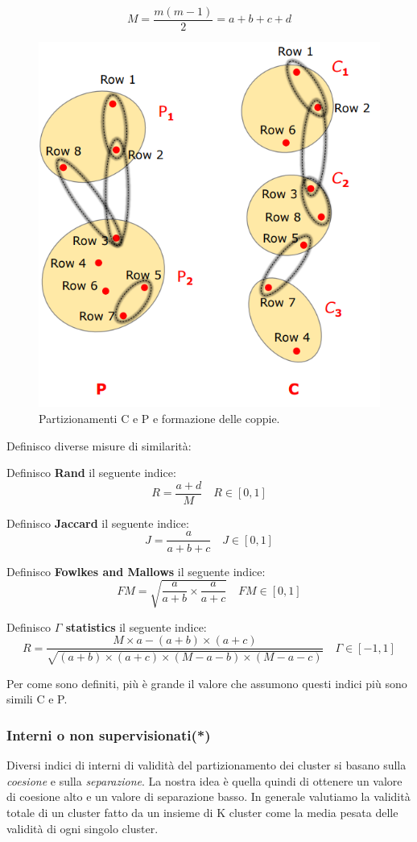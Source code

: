 \[M =  \frac{m(m-1)}{2} =  a+b+c+d\]

\begin{figure}[H]
	\centering
	\includegraphics[height=0.40 \linewidth]{clustering/pict/partizionamenti.png}
	\caption{Partizionamenti C e P e formazione delle coppie.}
\end{figure}

Definisco diverse misure di similarità:

	 \begin{defn}
		Definisco \textbf{Rand} il seguente indice:
		 \[R = \frac{a + d}{M} \quad R \in [0,1]\]
			\end{defn}
		\begin{defn}
			Definisco \textbf{Jaccard} il seguente indice:
			\[J = \frac{a}{a + b + c} \quad J \in [0,1]\]
		\end{defn}
		\begin{defn}
			Definisco \textbf{Fowlkes and Mallows} il seguente indice:
			\[FM = \sqrt{\frac{a}{a + b} \times \frac{a}{a + c}} \quad FM \in [0,1]\]
		\end{defn}
		 \begin{defn}
			Definisco \textbf{$\Gamma$ statistics} il seguente indice:
			\[R = \frac{M \times a - (a+b)\times (a+c)}{\sqrt{(a+b)\times (a+c)\times(M-a-b)\times(M-a-c)}} \quad \Gamma \in [-1,1]\]
		\end{defn}	

Per come sono definiti, più è grande il valore che assumono questi indici più sono simili C e P.
\subsubsection{Interni o non supervisionati(*)}
Diversi indici di interni di validità del partizionamento dei cluster si basano sulla \textit{coesione} e sulla \textit{separazione}. La nostra idea è quella quindi di ottenere un valore di coesione alto e un valore di separazione basso.
In generale valutiamo la validità totale di un cluster fatto da un insieme di K cluster come la media pesata delle validità di ogni singolo cluster.

